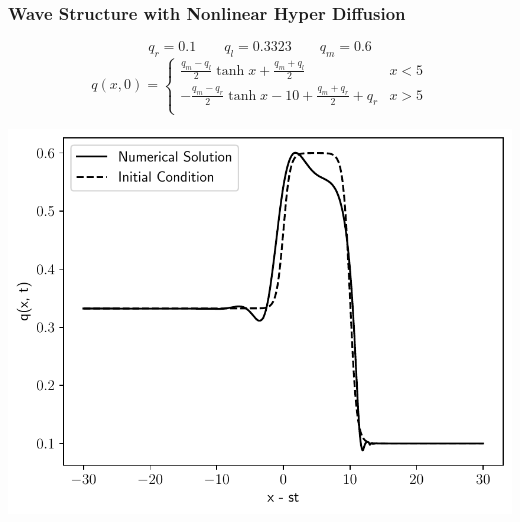 \documentclass[10pt]{beamer}
\begin{document}
      \begin{frame}
        \frametitle{Wave Structure with Nonlinear Hyper Diffusion}
        \[
          q_r = 0.1 \qquad q_l = 0.3323 \qquad q_m = 0.6
        \]
        \[
          q(x, 0) =
          \begin{cases}
            \frac{q_m - q_l}{2}\tanh{x} + \frac{q_m + q_l}{2} & x < 5 \\
            -\frac{q_m - q_r}{2}\tanh{x - 10} + \frac{q_m + q_r}{2} + q_r & x > 5 \\
          \end{cases}
        \]
        \begin{center}
          \includegraphics[scale=0.4]{Figures/case_2_2.pdf}
        \end{center}
      \end{frame}
\end{document}
